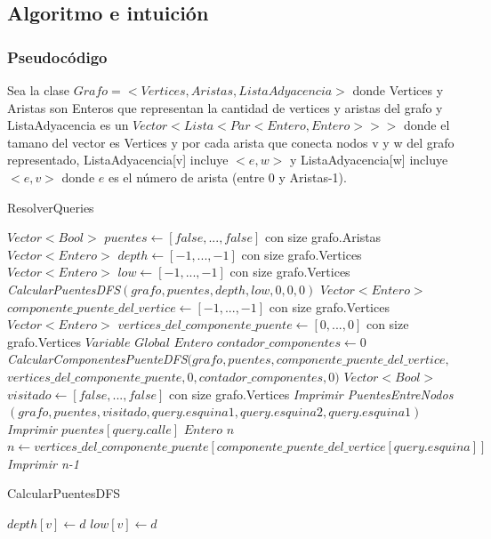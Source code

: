 \subsection{Algoritmo e intuición}

\subsubsection*{Pseudocódigo}

Sea la clase $Grafo = <Vertices, Aristas, ListaAdyacencia>$
	donde Vertices y Aristas son Enteros que representan la cantidad de vertices y aristas del grafo y
	ListaAdyacencia es un $Vector<Lista<Par<Entero, Entero>>>$ donde
	el tamano del vector es Vertices y por cada arista que conecta nodos v 
	y w del grafo representado, ListaAdyacencia[v] incluye $<e, w>$ y
	ListaAdyacencia[w] incluye $<e, v>$ donde $e$ es el número de arista (entre 0 y Aristas-1).

\begin{algorithm}[]
    \caption{ResolverQueries}
    $Vector<Bool>$ $puentes \gets [false,...,false]$ con size grafo.Aristas \;
	$Vector<Entero>$ $depth \gets [-1,...,-1]$ con size grafo.Vertices \;
	$Vector<Entero>$ $low \gets [-1,...,-1]$ con size grafo.Vertices \;
	\emph{CalcularPuentesDFS$(grafo, puentes, depth, low, 0, 0, 0)$} \;
	$Vector<Entero>$ $componente\_puente\_del\_vertice \gets [-1,...,-1]$ con size grafo.Vertices \;
	$Vector<Entero>$ $vertices\_del\_componente\_puente \gets [0,...,0]$ con size grafo.Vertices \;
	$Variable$ $Global$ $Entero$ $contador\_componentes \gets 0$ \;
	\emph{CalcularComponentesPuenteDFS$(grafo, puentes, componente\_puente\_del\_vertice, $ $ vertices\_del\_componente\_puente, 0, contador\_componentes, 0)$} \;
	 {
		 {
			$Vector<Bool>$ $visitado \gets [false,...,false]$ con size grafo.Vertices \;
			\emph{Imprimir PuentesEntreNodos$(grafo, puentes, visitado, query.esquina1, query.esquina2, query.esquina1)$}
		}
		 {
			\emph{Imprimir $puentes[query.calle]$}
		}
		 {
			$Entero$ $n$ \;
			$n \gets vertices\_del\_componente\_puente[componente\_puente\_del\_vertice[query.esquina]]$ \;
			\emph{Imprimir n-1}
		}
	}
\end{algorithm}

\begin{algorithm}[]
    \caption{CalcularPuentesDFS}
    $depth[v] \gets d$ \;
	$low[v] \gets d$ \;
	 {
	}
\end{algorithm}

